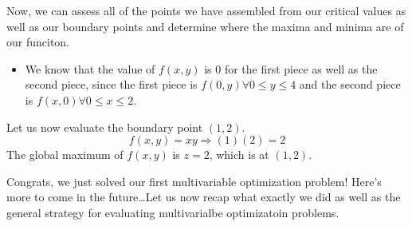 \documentclass{report}
\begin{document}
\begin{sloppypar}
\par Now, we can assess all of the points we
have assembled from our critical values
as well as our boundary points and determine
where the maxima and minima are of our funciton.
\begin{itemize}
  \item We know that the value of $f(x,y)$ is
        0 for the first piece as well as the
        second piece, since the first piece is
        $ f(0, y) \forall 0 \le y \le 4$ and
        the second piece is $ f(x, 0) \forall
        0 \le x \le 2 $.
\end{itemize}
Let us now evaluate the boundary point $ (1, 2)$.
\[ f(x,y) = xy \Rightarrow (1)(2) = 2 \]
The global maximum of $ f(x,y)$ is $z =2$, which is
at $ (1,2)$.

\par Congrats, we just solved our first multivariable
optimization problem! Here's more to come in the
future\dots Let us now recap what exactly we did
as well as the general strategy for evaluating
multivarialbe optimizatoin problems.


\end{sloppypar}
\end{document}
